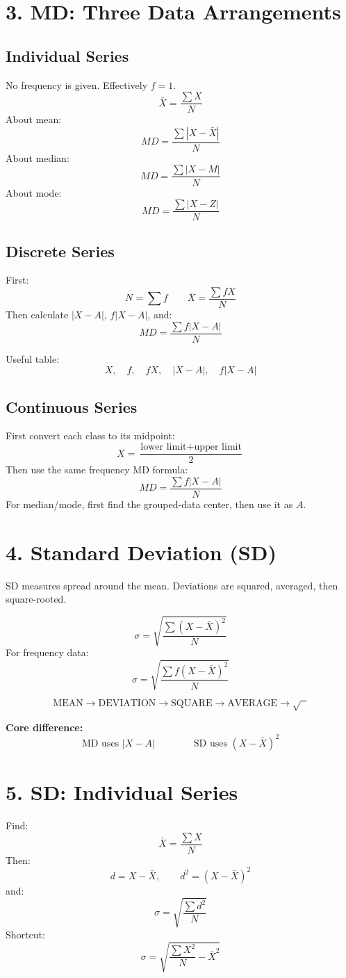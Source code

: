 \documentclass[10pt,a4paper]{article}
\newcommand{\F}[1]{\[\boxed{\displaystyle #1}\]}
\begin{document}
\section*{3. MD: Three Data Arrangements}

\subsection*{Individual Series}
No frequency is given. Effectively $f=1$.
\[
\bar X=\frac{\sum X}{N}
\]
About mean:
\[
MD=\frac{\sum|X-\bar X|}{N}
\]
About median:
\[
MD=\frac{\sum|X-M|}{N}
\]
About mode:
\[
MD=\frac{\sum|X-Z|}{N}
\]

\subsection*{Discrete Series}
First:
\F{N=\sum f\qquad\bar X=\frac{\sum fX}{N}}
Then calculate $|X-A|$, $f|X-A|$, and:
\F{MD=\frac{\sum f|X-A|}{N}}

Useful table:
\[
\boxed{X,\quad f,\quad fX,\quad |X-A|,\quad f|X-A|}
\]

\subsection*{Continuous Series}
First convert each class to its midpoint:
\F{X=\frac{\text{lower limit}+\text{upper limit}}{2}}
Then use the same frequency MD formula:
\F{MD=\frac{\sum f|X-A|}{N}}
For median/mode, first find the grouped-data center, then use it as $A$.

\section*{4. Standard Deviation (SD)}
SD measures spread around the mean. Deviations are squared, averaged, then square-rooted.

\F{\sigma=\sqrt{\frac{\sum (X-\bar X)^2}{N}}}
For frequency data:
\F{\sigma=\sqrt{\frac{\sum f(X-\bar X)^2}{N}}}

\[
\boxed{\text{MEAN}\rightarrow\text{DEVIATION}\rightarrow
\text{SQUARE}\rightarrow\text{AVERAGE}\rightarrow\sqrt{\phantom{x}}}
\]

\textbf{Core difference:}
\[
\text{MD uses }|X-A|
\qquad\qquad
\text{SD uses }(X-\bar X)^2
\]

\section*{5. SD: Individual Series}
Find:
\F{\bar X=\frac{\sum X}{N}}
Then:
\[
d=X-\bar X,\qquad d^2=(X-\bar X)^2
\]
and:
\F{\sigma=\sqrt{\frac{\sum d^2}{N}}}
Shortcut:
\F{\sigma=\sqrt{\frac{\sum X^2}{N}-\bar X^2}}
\end{document}
